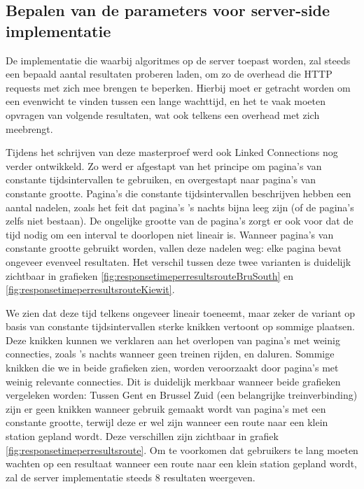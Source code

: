 \subsection{Bepalen van de parameters voor server-side implementatie}

De implementatie die waarbij algoritmes op de server toepast worden, zal steeds een bepaald aantal resultaten proberen laden, om zo de overhead die HTTP requests met zich mee brengen te beperken. Hierbij moet er getracht worden om een evenwicht te vinden tussen een lange wachttijd, en het te vaak moeten opvragen van volgende resultaten, wat ook telkens een overhead met zich meebrengt.

Tijdens het schrijven van deze masterproef werd ook Linked Connections nog verder ontwikkeld. Zo werd er afgestapt van het principe om pagina's van constante tijdsintervallen te gebruiken, en overgestapt naar pagina's van constante grootte. Pagina's die constante tijdsintervallen beschrijven hebben een aantal nadelen, zoals het feit dat pagina's 's nachts bijna leeg zijn (of de pagina's zelfs niet bestaan). De ongelijke grootte van de pagina's zorgt er ook voor dat de tijd nodig om een interval te doorlopen niet lineair is. Wanneer pagina's van constante grootte gebruikt worden, vallen deze nadelen weg: elke pagina bevat ongeveer evenveel resultaten. Het verschil tussen deze twee varianten is duidelijk zichtbaar in grafieken \ref{fig:responsetimeperresultsrouteBruSouth} en \ref{fig:responsetimeperresultsrouteKiewit}. 

 We zien dat deze tijd telkens ongeveer lineair toeneemt, maar zeker de variant op basis van constante tijdsintervallen sterke knikken vertoont op sommige plaatsen. Deze knikken kunnen we verklaren aan het overlopen van pagina's met weinig connecties, zoals 's nachts wanneer geen treinen rijden, en daluren. Sommige knikken die we in beide grafieken zien, worden veroorzaakt door pagina's met weinig relevante connecties. Dit is duidelijk merkbaar wanneer beide grafieken vergeleken worden: Tussen Gent en Brussel Zuid (een belangrijke treinverbinding) zijn er geen knikken wanneer gebruik gemaakt wordt van pagina's met een constante grootte, terwijl deze er wel zijn wanneer een route naar een klein station gepland wordt. Deze verschillen zijn zichtbaar in grafiek \ref{fig:responsetimeperresultsroute}. Om te voorkomen dat gebruikers te lang moeten wachten op een resultaat wanneer een route naar een klein station gepland wordt, zal de server implementatie steeds 8 resultaten weergeven.

